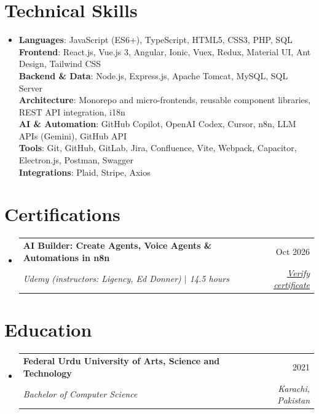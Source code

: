 \documentclass[letterpaper,10.5pt]{article}
\makeatletter
\newcommand{\resumeSubheading}[4]{\vspace{-2pt}\item\begin{tabular*}{0.97\textwidth}[t]{l@{\extracolsep{\fill}}r}\textbf{#1}&#2\\\textit{\small#3}&\textit{\small#4}\\\end{tabular*}\vspace{-7pt}}
\newcommand{\resumeSubHeadingListStart}{\begin{itemize}[leftmargin=0.15in,label={}]}
\newcommand{\resumeSubHeadingListEnd}{\end{itemize}}
\makeatother
\begin{document}
\section{Technical Skills}
\begin{itemize}[leftmargin=0.15in,label={}]\small\item{
\textbf{Languages}{: JavaScript (ES6+), TypeScript, HTML5, CSS3, PHP, SQL}\\
\textbf{Frontend}{: React.js, Vue.js 3, Angular, Ionic, Vuex, Redux, Material UI, Ant Design, Tailwind CSS}\\
\textbf{Backend \& Data}{: Node.js, Express.js, Apache Tomcat, MySQL, SQL Server}\\
\textbf{Architecture}{: Monorepo and micro-frontends, reusable component libraries, REST API integration, i18n}\\
\textbf{AI \& Automation}{: GitHub Copilot, OpenAI Codex, Cursor, n8n, LLM APIs (Gemini), GitHub API}\\
\textbf{Tools}{: Git, GitHub, GitLab, Jira, Confluence, Vite, Webpack, Capacitor, Electron.js, Postman, Swagger}\\
\textbf{Integrations}{: Plaid, Stripe, Axios}
}\end{itemize}

\section{Certifications}
\resumeSubHeadingListStart
\resumeSubheading{AI Builder: Create Agents, Voice Agents \& Automations in n8n}{Oct 2026}{Udemy (instructors: Ligency, Ed Donner) $|$ 14.5 hours}{\href{https://ude.my/UC-424ac49c-924c-48de-ba00-cb76db8e5f4d}{\underline{Verify certificate}}}
\resumeSubHeadingListEnd

\section{Education}
\resumeSubHeadingListStart
\resumeSubheading{Federal Urdu University of Arts, Science and Technology}{2021}{Bachelor of Computer Science}{Karachi, Pakistan}
\resumeSubHeadingListEnd
\end{document}

